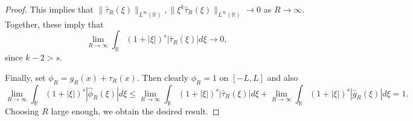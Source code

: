 \begin{proof}
 This implies that $\|\hat{\tau}_R(\xi)\|_{L^\infty(\mathbb{R})},\|\xi^{k}\hat{\tau}_R(\xi)\|_{L^\infty(\mathbb{R})}\rightarrow 0$ as $R\rightarrow \infty$. Together, these imply that
 \begin{equation}
  \lim_{R\rightarrow \infty} \int_{\mathbb{R}}(1+|\xi|)^s|\hat{\tau}_R(\xi)|d\xi \rightarrow 0,
 \end{equation}
 since $k-2 > s$.
 
 Finally, set $\phi_R = g_R(x) + \tau_R(x)$. Then clearly $\phi_R = 1$ on $[-L,L]$ and also
 \begin{equation}
  \lim_{R\rightarrow \infty} \int_{\mathbb{R}}(1+|\xi|)^s|\hat{\phi}_R(\xi)|d\xi \leq \lim_{R\rightarrow \infty} \int_{\mathbb{R}}(1+|\xi|)^s|\hat{\tau}_R(\xi)|d\xi + \lim_{R\rightarrow \infty} \int_{\mathbb{R}}(1+|\xi|)^s|\hat{g}_R(\xi)|d\xi = 1.
 \end{equation}
 Choosing $R$ large enough, we obtain the desired result.
\end{proof}

